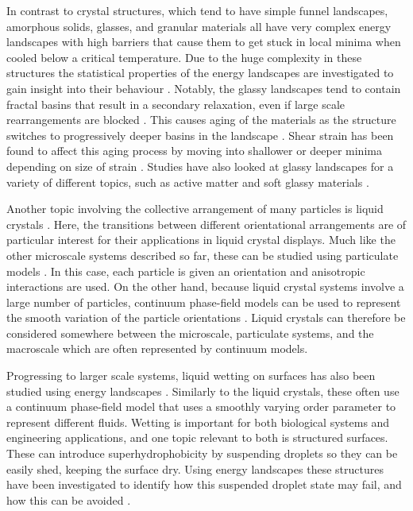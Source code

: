 In contrast to crystal structures, which tend to have simple funnel landscapes, amorphous solids, glasses, and granular materials all have very complex energy landscapes with high barriers that cause them to get stuck in local minima when cooled below a critical temperature.
Due to the huge complexity in these structures the statistical properties of the energy landscapes are investigated to gain insight into their behaviour \cite{Heuer2008,Raza2015}.
Notably, the glassy landscapes tend to contain fractal basins that result in a secondary relaxation, even if large scale rearrangements are blocked \cite{Charbonneau2014}.
This causes aging of the materials as the structure switches to progressively deeper basins in the landscape \cite{Raza2015}.
Shear strain has been found to affect this aging process by moving into shallower or deeper minima depending on size of strain \cite{Lacks2004,Jin2017}.
Studies have also looked at glassy landscapes for a variety of different topics, such as active matter \cite{Morse2021} and soft glassy materials \cite{Hwang2016}.

Another topic involving the collective arrangement of many particles is liquid crystals \cite{Chakrabarti2008,Kusumaatmaja2015a,Kusumaatmaja2015}.
Here, the transitions between different orientational arrangements are of particular interest for their applications in liquid crystal displays.
Much like the other microscale systems described so far, these can be studied using particulate models \cite{Chakrabarti2008}.
In this case, each particle is given an orientation and anisotropic interactions are used.
On the other hand, because liquid crystal systems involve a large number of particles, continuum phase-field models can be used to represent the smooth variation of the particle orientations \cite{Kusumaatmaja2015a,Kusumaatmaja2015}.
Liquid crystals can therefore be considered somewhere between the microscale, particulate systems, and the macroscale which are often represented by continuum models.

Progressing to larger scale systems, liquid wetting on surfaces has also been studied using energy landscapes \cite{Ren2014,Panter2019a}.
Similarly to the liquid crystals, these often use a continuum phase-field model that uses a smoothly varying order parameter to represent different fluids.
Wetting is important for both biological systems and engineering applications, and one topic relevant to both is structured surfaces.
These can introduce superhydrophobicity by suspending droplets so they can be easily shed, keeping the surface dry.
Using energy landscapes these structures have been investigated to identify how this suspended droplet state may fail, and how this can be avoided \cite{Ren2014,Panter2019a}.

